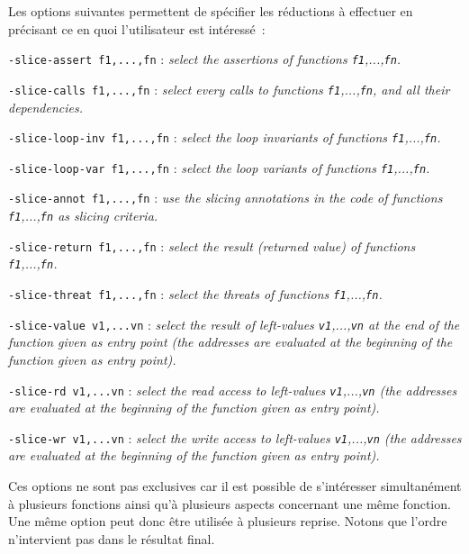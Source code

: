 Les options suivantes permettent de spécifier les réductions à
effectuer en précisant ce en quoi l'utilisateur est intéressé~:
\begin{description} 
\item {\tt -slice-assert f1,...,fn} :  
      {\sl select the assertions of functions {\tt f1},...,{\tt fn}.}

\item {\tt -slice-calls f1,...,fn} :  
      {\sl select every calls to functions {\tt f1},...,{\tt fn}, and all their dependencies.}

\item {\tt-slice-loop-inv f1,...,fn} : 
      {\sl select the loop invariants of functions {\tt f1},...,{\tt fn}.}
\item {\tt -slice-loop-var f1,...,fn} : 
      {\sl select the loop variants of functions {\tt f1},...,{\tt fn}.}
\item {\tt -slice-annot f1,...,fn} :
      {\sl use the slicing annotations in the code of functions {\tt f1},...,{\tt fn} as slicing criteria.}

\item {\tt -slice-return f1,...,fn} :  
      {\sl select the result (returned value) of functions {\tt f1},...,{\tt fn}.}

\item {\tt -slice-threat f1,...,fn} :  
      {\sl select the threats of functions {\tt f1},...,{\tt fn}.}

\item {\tt -slice-value v1,...vn} :  
      {\sl select the result of left-values {\tt v1},...,{\tt vn}
        at the end of the function given as entry point
        (the addresses are evaluated at the beginning of the function given as entry point).}

\item {\tt -slice-rd v1,...vn} :  
      {\sl select the read access to left-values {\tt v1},...,{\tt vn}
        (the addresses are evaluated at the beginning of the function given as entry point).}

\item {\tt -slice-wr v1,...vn} :  
      {\sl select the write access to left-values {\tt v1},...,{\tt vn}
        (the addresses are evaluated at the beginning of the function given as entry point).}

\end{description}

Ces options ne sont pas exclusives 
car il est possible de s'intéresser simultanément 
à plusieurs fonctions 
ainsi qu'à plusieurs aspects concernant une même fonction.
Une même option peut donc être utilisée à plusieurs reprise.
Notons que l'ordre n'intervient pas dans le résultat final.

